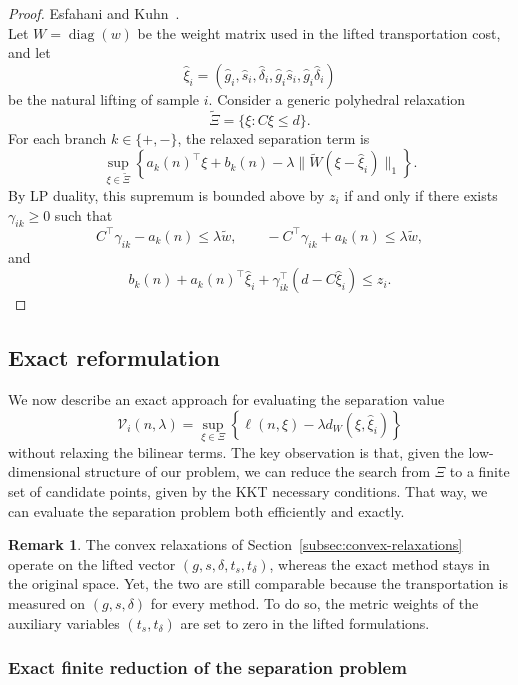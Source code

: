 \documentclass[11pt]{article}
\newcommand{\XiSet}{\Xi}
\newcommand{\hxi}{\widehat\xi}
\theoremstyle{plain}
\theoremstyle{definition}
\newtheorem{remark}{Remark}
\begin{document}
\begin{proof}Esfahani and Kuhn~\cite{EsfahaniKuhn2018}.\\

 Let $ W=\operatorname{diag}( w)$ be the weight matrix used in the lifted transportation cost, and let \[ \widehat{\xi}_i = (\widehat g_i,\widehat s_i,\widehat\delta_i, \widehat g_i\widehat s_i, \widehat g_i\widehat\delta_i) \] be the natural lifting of sample $i$. 
 Consider a generic polyhedral relaxation \[ \widetilde\Xi = \{\xi:C\xi\le d\}.\]
 For each branch $k\in\{+,-\}$, the relaxed separation term is \[ \sup_{\xi\in\widetilde\Xi} \left\{ a_k(n)^\top\xi+b_k(n) - \lambda \|\widetilde W(\xi-\widehat{\xi}_i)\|_1 \right\}. \] 
 By LP duality, this supremum is bounded above by $z_i$ if and only if there exists $\gamma_{ik}\ge0$ such that \[ C^\top\gamma_{ik}-a_k(n)\le \lambda \widetilde w, \qquad -C^\top\gamma_{ik}+a_k(n)\le \lambda \widetilde w, \] and \[ b_k(n) + a_k(n)^\top\widehat{\xi}_i + \gamma_{ik}^\top \left(d-C\widehat{\xi}_i\right) \le z_i . \] 
\end{proof}


\subsection{Exact reformulation} 
\label{subsec:exact-reformulation} 
We now describe an exact approach for evaluating the separation value
\begin{equation}\label{eq:separation-problem}
\mathcal V_i(n,\lambda) = \sup_{\xi\in\XiSet} \left\{ \ell(n,\xi)-\lambda d_W(\xi,\hxi_i) \right\}
\end{equation}
without relaxing the bilinear terms.
The key observation is that, given the low-dimensional structure of our problem, we can reduce the search from $\Xi$ to a finite set of candidate points, given by the KKT necessary conditions. 
That way, we can evaluate the separation problem both efficiently and exactly.

\begin{remark}
The convex relaxations of Section~\ref{subsec:convex-relaxations} operate on the lifted vector $(g,s,\delta,t_s,t_\delta)$, whereas the exact method stays in the original space. 
Yet, the two are still comparable because the transportation is measured on $(g,s,\delta)$ for every method.
To do so, the metric weights of the auxiliary variables $(t_s,t_\delta)$ are set to zero in the lifted formulations.
\end{remark}

\subsubsection{Exact finite reduction of the separation problem}
\label{subsubsec:finite-separation}
 
\end{document}
